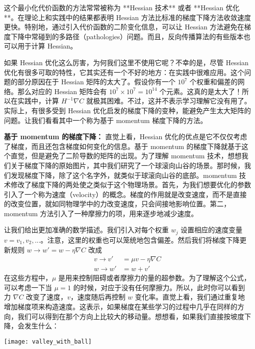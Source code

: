 这个最小化代价函数的方法常常被称为 **Hessian 技术** 或者 **Hessian 优化**。在理论上和实践中的结果都表明 Hessian 方法比标准的梯度下降方法收敛速度更快。特别地，通过引入代价函数的二阶变化信息，可以让 Hessian 方法避免在梯度下降中常碰到的多路径（pathologies）问题。而且，反向传播算法的有些版本也可以用于计算 Hessian。

如果 Hessian 优化这么厉害，为何我们这里不使用它呢？不幸的是，尽管 Hessian 优化有很多可取的特性，它其实还有一个不好的地方：在实践中很难应用。这个问题的部分原因在于 Hessian 矩阵的太大了。假设你有一个 $10^7$ 个权重和偏差的网络。那么对应的 Hessian 矩阵会有 $10^7 \times 10^7=10^14$ 个元素。这真的是太大了！所以在实践中，计算 $H^{-1}\nabla C$ 就极其困难。不过，这并不表示学习理解它没有用了。实际上，有很多受到 Hessian 优化启发的梯度下降的变种，能避免产生太大矩阵的问题。让我们看看其中一个称为基于 momentum 梯度下降的方法。

\textbf{基于 momentum 的梯度下降：} 直觉上看，Hessian 优化的优点是它不仅仅考虑了梯度，而且还包含梯度如何变化的信息。基于 momentum 的梯度下降就基于这个直觉，但是避免了二阶导数的矩阵的出现。为了理解 momentum 技术，想想我们关于梯度下降的原始图片，其中我们研究了一个球滚向山谷的场景。那时候，我们发现梯度下降，除了这个名字外，就类似于球滚向山谷的底部。momentum 技术修改了梯度下降的两处使之类似于这个物理场景。首先，为我们想要优化的参数引入了一个称为速度（velocity）的概念。梯度的作用就是改变速度，而不是直接的改变位置，就如同物理学中的力改变速度，只会间接地影响位置。第二，momentum 方法引入了一种摩擦力的项，用来逐步地减少速度。

让我们给出更加准确的数学描述。我们引入对每个权重 $w_j$ 设置相应的速度变量 $v=v_1,v_2,...$。注意，这里的权重也可以笼统地包含偏差。然后我们将梯度下降更新规则 $w\rightarrow w'=w-\eta\nabla C$ 改成
\begin{align} 
  v \rightarrow v' &= \mu v - \eta \nabla C \label{eq:107}\tag{107}\\
  w \rightarrow w' &= w+v' \label{eq:108}\tag{108}
\end{align}
在这些方程中，$\mu$ 是用来控制阻碍或者摩擦力的量的超参数。为了理解这个公式，可以考虑一下当 $\mu=1$ 的时候，对应于没有任何摩擦力。所以，此时你可以看到力 $\nabla C$ 改变了速度，$v$，速度随后再控制 $w$ 变化率。直觉上看，我们通过重复地增加梯度项来构造速度。这表示，如果梯度在某些学习的过程中几乎在同样的方向，我们可以得到在那个方向上比较大的移动量。想想看，如果我们直接按坡度下降，会发生什么：

\begin{center}
  \texttt{[image: valley\_with\_ball]}
\end{center}

